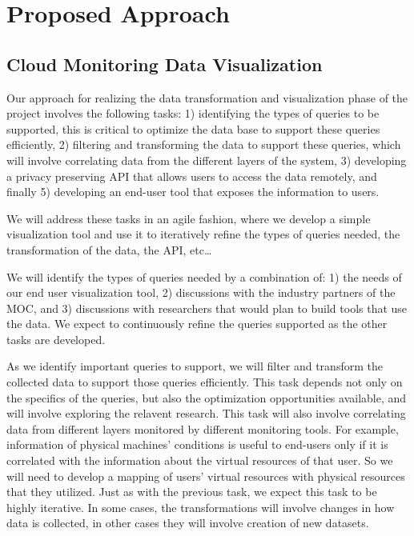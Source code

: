 \section{Proposed Approach}
\label{sec:ProposedApproach}



\subsection{Cloud Monitoring Data Visualization}
  
Our approach for realizing the data transformation and visualization phase of the project involves the following tasks: 1) identifying the types of queries to be supported, this is critical to optimize the data base to support these queries efficiently, 2) filtering and transforming the data to support these queries, which will involve correlating data from the different layers of the system, 3) developing a privacy preserving API that allows users to access the data remotely, and finally 5) developing an end-user tool that exposes the information to users.  

We will address these tasks in an agile fashion, where we develop a simple visualization tool and use it to iteratively refine the types of queries needed, the transformation of the data, the API, etc…  

We will identify the types of queries needed by a combination of: 1) the needs of our end user visualization tool, 2) discussions with the industry partners of the MOC, and 3) discussions with researchers that would plan to build tools that use the data.  We expect to continuously refine the queries supported as the other tasks are developed. 

As we identify important queries to support, we will  filter and transform the collected data to support those queries efficiently.  This task depends not only on the specifics of the queries, but also the optimization opportunities available, and will involve exploring the relavent research.   This task will also involve correlating data from different layers monitored by different monitoring tools. For example, information of physical machines’ conditions is useful to end-users only if it is correlated with the information about the virtual resources of that user. So we will need to develop a mapping of users’ virtual resources with physical resources that they utilized.  Just as with the previous task, we expect this task to be highly iterative.  In some cases, the transformations will involve changes in how data is collected, in other cases they will involve creation of new datasets. 

